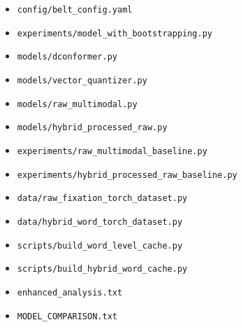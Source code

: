 \documentclass[11pt]{article}
\begin{document}
\begin{itemize}
    \item \texttt{config/belt\_config.yaml}
    \item \texttt{experiments/model\_with\_bootstrapping.py}
    \item \texttt{models/dconformer.py}
    \item \texttt{models/vector\_quantizer.py}
    \item \texttt{models/raw\_multimodal.py}
    \item \texttt{models/hybrid\_processed\_raw.py}
    \item \texttt{experiments/raw\_multimodal\_baseline.py}
    \item \texttt{experiments/hybrid\_processed\_raw\_baseline.py}
    \item \texttt{data/raw\_fixation\_torch\_dataset.py}
    \item \texttt{data/hybrid\_word\_torch\_dataset.py}
    \item \texttt{scripts/build\_word\_level\_cache.py}
    \item \texttt{scripts/build\_hybrid\_word\_cache.py}
    \item \texttt{enhanced\_analysis.txt}
    \item \texttt{MODEL\_COMPARISON.txt}
\end{itemize}
\end{document}
